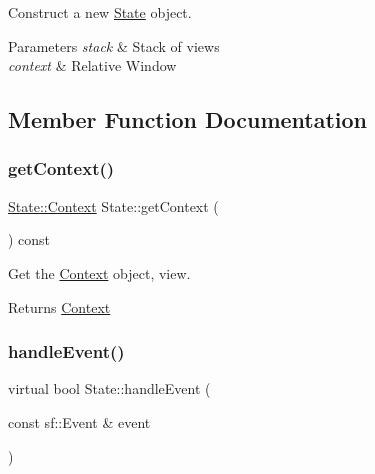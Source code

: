 Construct a new \hyperlink{classState}{State} object. 


\begin{DoxyParams}{Parameters}
{\em stack} & Stack of views \\
\hline
{\em context} & Relative Window \\
\hline
\end{DoxyParams}


\subsection{Member Function Documentation}
\mbox{\label{classState_a93a72915d1aad6d8f7eacc81094dc920}} 
\subsubsection{\texorpdfstring{get\+Context()}{getContext()}}
{\footnotesize\ttfamily \hyperlink{structState_1_1Context}{State\+::\+Context} State\+::get\+Context (\begin{DoxyParamCaption}{ }\end{DoxyParamCaption}) const\hspace{0.3cm}{\ttfamily [protected]}}



Get the \hyperlink{structState_1_1Context}{Context} object, view. 

\begin{DoxyReturn}{Returns}
\hyperlink{structState_1_1Context}{Context} 
\end{DoxyReturn}
\mbox{\label{classState_a19965f83460b248c42952aac8d001206}} 
\subsubsection{\texorpdfstring{handle\+Event()}{handleEvent()}}
{\footnotesize\ttfamily virtual bool State\+::handle\+Event (\begin{DoxyParamCaption}\item[{const sf\+::\+Event \&}]{event }\end{DoxyParamCaption})\hspace{0.3cm}{\ttfamily [pure virtual]}}



